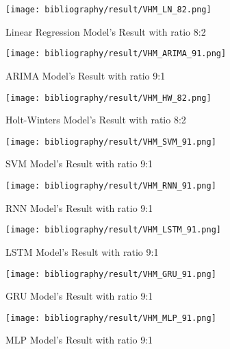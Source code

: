 \documentclass{ieeeojies}
\begin{document}
	\begin{figure}[H]
		\centering
		\begin{minipage}{0.9\linewidth}
			\centering
			\texttt{[image: bibliography/result/VHM\_LN\_82.png]}
			\caption{Linear Regression Model's Result with ratio 8:2}
			\label{fig1.1}
		\end{minipage}
	\end{figure}
	\begin{figure}[H]
		\centering
		\begin{minipage}{0.9\linewidth}
			\centering
			\texttt{[image: bibliography/result/VHM\_ARIMA\_91.png]}
			\caption{ARIMA Model's Result with ratio 9:1}
			\label{fig1.2}
		\end{minipage}
	\end{figure}
	\begin{figure}[H]
		\centering
		\begin{minipage}{0.9\linewidth}
			\centering
			\texttt{[image: bibliography/result/VHM\_HW\_82.png]}
			\caption{Holt-Winters Model's Result with ratio 8:2}
			\label{fig1.3}
		\end{minipage}
	\end{figure}
	\begin{figure}[H]
		\centering
		\begin{minipage}{0.9\linewidth}
			\centering
			\texttt{[image: bibliography/result/VHM\_SVM\_91.png]}
			\caption{SVM Model's Result with ratio 9:1}
			\label{fig1.4}
		\end{minipage}
	\end{figure}
	\begin{figure}[H]
		\centering
		\begin{minipage}{0.9\linewidth}
			\centering
			\texttt{[image: bibliography/result/VHM\_RNN\_91.png]}
			\caption{RNN Model's Result with ratio 9:1}
			\label{fig1.5}
		\end{minipage}
	\end{figure}
	\begin{figure}[H]
		\centering
		\begin{minipage}{0.9\linewidth}
			\centering
			\texttt{[image: bibliography/result/VHM\_LSTM\_91.png]}
			\caption{LSTM Model's Result with ratio 9:1}
			\label{fig1.6}
		\end{minipage}
	\end{figure}
	\begin{figure}[H]
		\centering
		\begin{minipage}{0.9\linewidth}
			\centering
			\texttt{[image: bibliography/result/VHM\_GRU\_91.png]}
			\caption{GRU Model's Result with ratio 9:1}
			\label{fig1.7}
		\end{minipage}
	\end{figure}
	\begin{figure}[H]
		\centering
		\begin{minipage}{0.9\linewidth}
			\centering
			\texttt{[image: bibliography/result/VHM\_MLP\_91.png]}
			\caption{MLP Model's Result with ratio 9:1}
			\label{fig1.8}
		\end{minipage}
	\end{figure}
	
\end{document}
